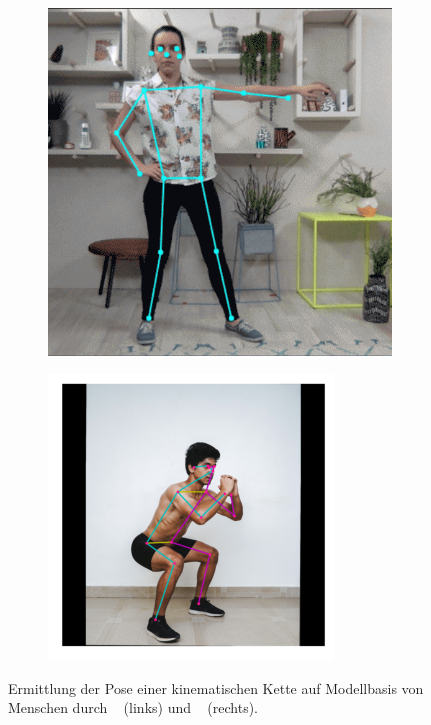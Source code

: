 \begin{figure}
    \centering
    \begin{subfigure}[t]{0.3\textwidth}
        \includegraphics[width=\textwidth]{gfx/posenet.png}
    \end{subfigure}
    \begin{subfigure}[t]{0.3\textwidth}
        \includegraphics[width=\textwidth]{gfx/movenet.png}
    \end{subfigure}
    \caption[Posenbestimmung durch maschinelles Lernen]{Ermittlung der Pose einer kinematischen Kette auf Modellbasis von Menschen durch ~\cite{Google2021} (links) und ~\cite{Google2021a} (rechts).}\label{fig:movenet}
    \label{fig:pose_estimation}
\end{figure}


